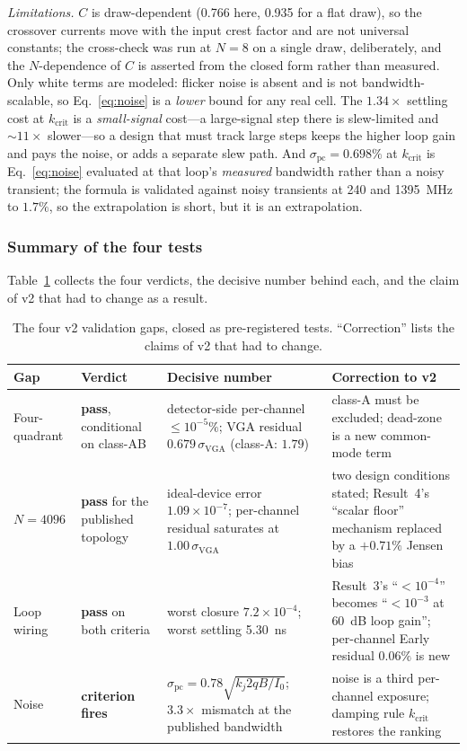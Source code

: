 \documentclass[11pt]{article}
\begin{document}
\textit{Limitations.} $C$ is draw-dependent (0.766 here, 0.935 for a flat draw), so the crossover currents move with the input crest factor and are not universal constants; the cross-check was run at $N = 8$ on a single draw, deliberately, and the $N$-dependence of $C$ is asserted from the closed form rather than measured. Only white terms are modeled: flicker noise is absent and is not bandwidth-scalable, so Eq.~\eqref{eq:noise} is a \textit{lower} bound for any real cell. The $1.34\times$ settling cost at $k_{\mathrm{crit}}$ is a \textit{small-signal} cost---a large-signal step there is slew-limited and ${\sim}11\times$ slower---so a design that must track large steps keeps the higher loop gain and pays the noise, or adds a separate slew path. And $\sigma_{\mathrm{pc}} = 0.698\%$ at $k_{\mathrm{crit}}$ is Eq.~\eqref{eq:noise} evaluated at that loop's \textit{measured} bandwidth rather than a noisy transient; the formula is validated against noisy transients at 240 and 1395~MHz to $1.7\%$, so the extrapolation is short, but it is an extrapolation.

\subsubsection{Summary of the four tests}

Table~\ref{tab:gaps} collects the four verdicts, the decisive number behind each, and the claim of v2 that had to change as a result.

\begin{table}[h]
\centering
\caption{The four v2 validation gaps, closed as pre-registered tests. ``Correction'' lists the claims of v2 that had to change.}
\label{tab:gaps}
\footnotesize
\begin{tabular}{p{2.3cm}p{2.6cm}p{4.6cm}p{5.0cm}}
\toprule
Gap & Verdict & Decisive number & Correction to v2 \\
\midrule
Four-quadrant & \textbf{pass}, conditional on class-AB & detector-side per-channel $\le10^{-5}\%$; VGA residual $0.679\,\sigma_{\mathrm{VGA}}$ (class-A: $1.79$) & class-A must be excluded; dead-zone is a new common-mode term \\
$N = 4096$ & \textbf{pass} for the published topology & ideal-device error $1.09\times10^{-7}$; per-channel residual saturates at $1.00\,\sigma_{\mathrm{VGA}}$ & two design conditions stated; Result~4's ``scalar floor'' mechanism replaced by a $+0.71\%$ Jensen bias \\
Loop wiring & \textbf{pass} on both criteria & worst closure $7.2\times10^{-4}$; worst settling 5.30~ns & Result~3's ``$<10^{-4}$'' becomes ``$<10^{-3}$ at 60~dB loop gain''; per-channel Early residual $0.06\%$ is new \\
Noise & \textbf{criterion fires} & $\sigma_{\mathrm{pc}} = 0.78\sqrt{k_j 2qB/I_0}$; $3.3\times$ mismatch at the published bandwidth & noise is a third per-channel exposure; damping rule $k_{\mathrm{crit}}$ restores the ranking \\
\bottomrule
\end{tabular}
\end{table}
\end{document}
